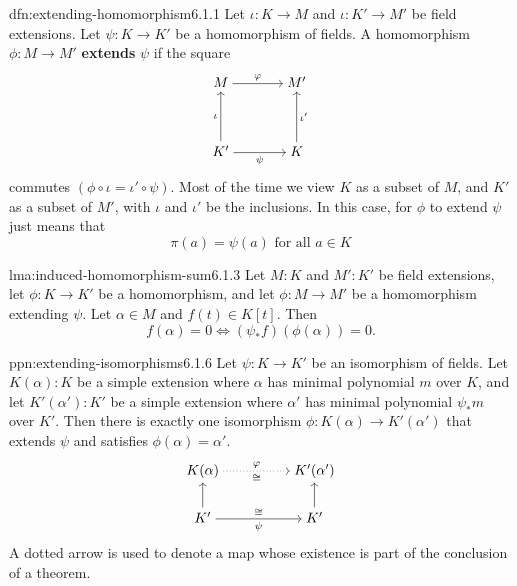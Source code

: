 \documentclass[landscape, 8pt]{extarticle}
\begin{document}
\begin{multicols}{3}
\begin{dfn}{dfn:extending-homomorphism}{6.1.1}
    Let $\iota : K \to M$ and $\iota : K' \to M'$ be field extensions. Let $\psi : K \to K'$ be a homomorphism of fields. A homomorphism $\phi : M \to M'$ \textbf{extends} $\psi$ if the square
\[\begin{tikzcd}[cramped, column sep=scriptsize]
	M && {M'} \\
	\\
	{K'} && K
	\arrow["\phi", from=1-1, to=1-3]
	\arrow["\iota", from=3-1, to=1-1]
	\arrow["\psi"', from=3-1, to=3-3]
	\arrow["{\iota'}"', from=3-3, to=1-3]
\end{tikzcd}\]
commutes $(\phi \circ \iota = \iota' \circ \psi)$. Most of the time we view $K$ as a subset of $M$, and $K'$ as a subset of $M'$, with $\iota$ and $\iota'$ be the inclusions. In this case, for $\phi$ to extend $\psi$ just means that
\[\pi(a) = \psi(a) \text{ for all } a\in K\]
\end{dfn}

\begin{lma}{lma:induced-homomorphism-sum}{6.1.3}
    Let $M : K$ and $M' : K'$ be field extensions, let $\phi : K \to K'$ be a homomorphism, and let $\phi : M \to M'$ be a homomorphism extending $\psi$. Let $\alpha\in M$ and $f(t) \in K[t]$. Then
    \[f(\alpha) = 0 \iff (\psi_{\ast} f)(\phi(\alpha)) = 0.\]
\end{lma}

\begin{ppn}{ppn:extending-isomorphisms}{6.1.6}
    Let $\psi : K \to K'$ be an isomorphism of fields. Let $K(\alpha) : K$ be a simple extension where $\alpha$ has minimal polynomial $m$ over $K$, and let $K'(\alpha') : K'$ be a simple extension where $\alpha'$ has minimal polynomial $\psi_{\ast}m$ over $K'$. Then there is exactly one isomorphism $\phi : K(\alpha) \to K'(\alpha')$ that extends $\psi$ and satisfies $\phi(\alpha) = \alpha'$.
\[\begin{tikzcd}[cramped]
	{K(\alpha)} && {K'(\alpha')} \\
	{K'} && {K'}
    \arrow["{\phi}", "\cong"', dotted, from=1-1, to=1-3]
	\arrow[from=2-1, to=1-1]
	\arrow["\psi"', "\cong", from=2-1, to=2-3]
	\arrow[from=2-3, to=1-3]
\end{tikzcd}\]
A dotted arrow is used to denote a map whose existence is part of the conclusion of a theorem.
\end{ppn}


\end{multicols}
\end{document}
